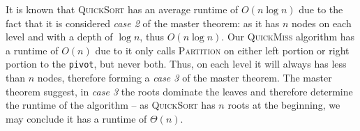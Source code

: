 \documentclass[11pt]{article}
\newcommand{\ilc}{\texttt}
\begin{document}
It is known that \textsc{QuickSort} has an average runtime of $O(n\log n)$ due to the fact that it is considered \textit{case 2} of the master theorem: as it has $n$ nodes on each level and with a depth of $\log n$, thus $O(n\log n)$. Our \textsc{QuickMiss} algorithm has a runtime of $O(n)$ due to it only calls \textsc{Partition} on either left portion or right portion to the \ilc{pivot}, but never both. Thus, on each level it will always has less than $n$ nodes, therefore forming a \textit{case 3} of the master theorem. The master theorem suggest, in \textit{case 3} the roots dominate the leaves and therefore determine the runtime of the algorithm -- as \textsc{QuickSort} has $n$ roots at the beginning, we may conclude it has a runtime of $\Theta(n)$.


%
% 
% 
\end{document}
